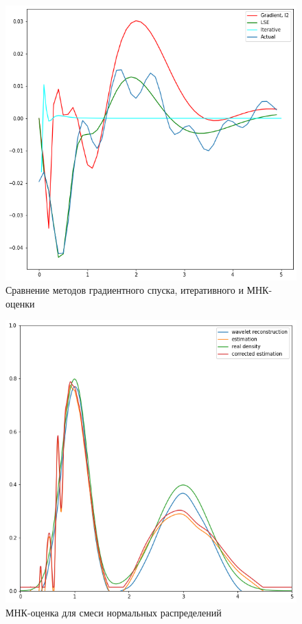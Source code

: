 \documentclass[12pt, a4paper]{report}
\begin{document}
\begin{figure}[h]
  \caption{Сравнение методов градиентного спуска, итеративного и МНК-оценки}
  \centering
  \includegraphics[width=\textwidth]{comp-method}
\end{figure}

\begin{figure}[h]
  \caption{МНК-оценка для смеси нормальных распределений}
  \centering
  \includegraphics[width=\textwidth]{est-lse}
\end{figure}
\end{document}
